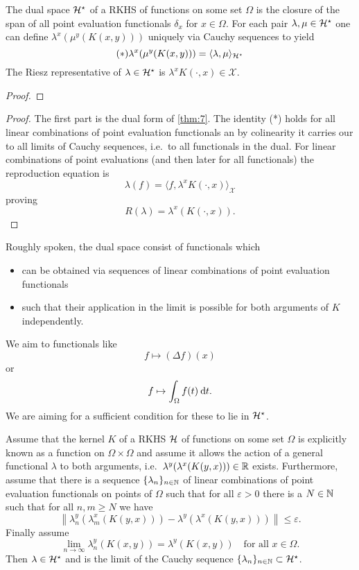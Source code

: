 \documentclass[../skript.tex]{subfiles}
\begin{document}
\begin{theorem} %
The dual space $\mathcal{H}^\star$ of a RKHS of functions on some set $\Omega$ is the closure of the span of all point evaluation functionals $\delta_x$ for $x \in \Omega$.
For each pair $\lambda, \mu \in \mathcal{H}^\star$ one can define $\lambda^x(\mu^y(K(x, y)))$ uniquely via Cauchy sequences to yield
\[
	(*)
	\lambda^x(\mu^y(K(x, y))) = \langle \lambda, \mu \rangle_{\mathcal{H}^\star}
\]
The Riesz representative of $\lambda \in \mathcal{H}^\star$ is $\lambda^x K(\cdot, x) \in \mathcal{X}$.
\end{theorem} %
\begin{theorem}

\end{theorem}
\begin{proof}

\end{proof}
\begin{proof}
The first part is the dual form of \cref{thm:7}.
The identity (*) holds for all linear combinations of point evaluation functionals an by colinearity it carries our to all limits of Cauchy sequences, i.e.\ to all functionals in the dual.
For linear combinations of point evaluations (and then later for all functionals) the reproduction equation is
\[
	\lambda(f) = \langle f, \lambda^x K(\cdot, x) \rangle_{\mathcal{X}}
\]
proving
\[
	R(\lambda) = \lambda^x(K(\cdot, x)).
\]
\end{proof}
Roughly spoken, the dual space consist of functionals which
\begin{itemize}
\item can be obtained via sequences of linear combinations of point evaluation functionals
\item such that their application in the limit is possible for both arguments of $K$ independently.
\end{itemize}
We aim to functionals like
\[
	f \mapsto (\Delta f)(x)
\]
or
\[
	f \mapsto \int_\Omega f(t) \:\mathrm{d}t.
\]
We are aiming for a sufficient condition for these to lie in $\mathcal{H}^\star$.
\begin{theorem} %
\label{eq:thm11}
Assume that the kernel $K$ of a RKHS $\mathcal{H}$ of functions on some set $\Omega$ is explicitly known as a function on $\Omega \times \Omega$ and assume it allows the action of a general functional $\lambda$ to both arguments, i.e.\ $\lambda^y(\lambda^x(K(y, x))) \in \mathbb{R}$ exists.
Furthermore, assume that there is a sequence $\{ \lambda_n \}_{n \in \mathbb{N}}$ of linear combinations of point evaluation functionals on points of $\Omega$ such that for all $\varepsilon > 0$ there is a $N \in \mathbb{N}$ such that for all $n, m \geq N$ we have
\[
	\left\| \lambda_n^y(\lambda_m^x(K(y,x))) - \lambda^y(\lambda^x(K(y, x))) \right\| \leq \varepsilon.
\]
Finally assume
\[
	\lim_{n \to \infty} \lambda_n^y(K(x,y)) = \lambda^y(K(x,y)) \quad \text{for all } x \in \Omega.
\]
Then $\lambda \in \mathcal{H}^\star$ and is the limit of the Cauchy sequence $\{ \lambda_n \}_{n \in \mathbb{N}} \subset \mathcal{H}^\star$.
\end{theorem}
\end{document}
